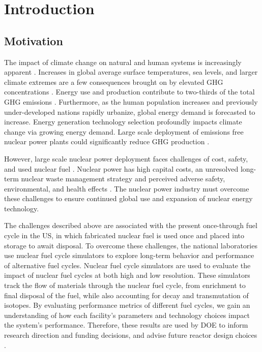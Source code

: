\chapter[Introduction]{Introduction}
\label{chap:1}

\section{Motivation}
The impact of climate change on natural and human systems 
is increasingly apparent \cite{noauthor_climate_2018}.
Increases in global average 
surface temperatures, sea levels, and larger climate extremes
are a few consequences brought on by elevated \gls{GHG} 
concentrations \cite{noauthor_climate_2018}.
Energy use and production contribute to 
two-thirds of the total \gls{GHG}
emissions \cite{noauthor_climate_2018}.
Furthermore, as the human population increases and previously 
under-developed nations rapidly urbanize, 
global energy demand is forecasted to increase.  
Energy generation technology selection 
profoundly impacts climate change via growing energy demand. 
Large scale deployment of emissions free nuclear power plants 
could significantly reduce GHG production 
\cite{noauthor_climate_2018}.  

However, large scale nuclear power deployment faces
challenges of cost, safety, and used nuclear fuel  
\cite{petti_future_2018}. 
Nuclear power has high capital costs, 
an unresolved long-term nuclear waste management 
strategy and perceived adverse safety, environmental, and health 
effects \cite{petti_future_2018}. 
The nuclear power industry must overcome these challenges 
to ensure continued global use and expansion 
of nuclear energy technology. 

The challenges described above are associated with 
the present once-through fuel cycle in the \gls{US}, 
in which fabricated nuclear fuel is used once and placed into 
storage to await disposal. 
To overcome these challenges, the national laboratories 
use nuclear fuel cycle simulators to explore 
long-term behavior and performance of alternative fuel cycles. 
Nuclear fuel cycle simulators are used to evaluate the impact of 
nuclear fuel cycles at both high and low resolution. 
These simulators track the flow of materials through the nuclear fuel cycle, 
from enrichment to final disposal of the fuel, while also accounting for 
decay and transmutation of isotopes. 
By evaluating performance metrics of different fuel cycles, we gain an 
understanding of how each facility's parameters and technology choices 
impact the system's performance. 
Therefore, these results are used by DOE to inform research direction
and funding decisions, and advise future reactor design choices 
\cite{yacout_modeling_2005}.

